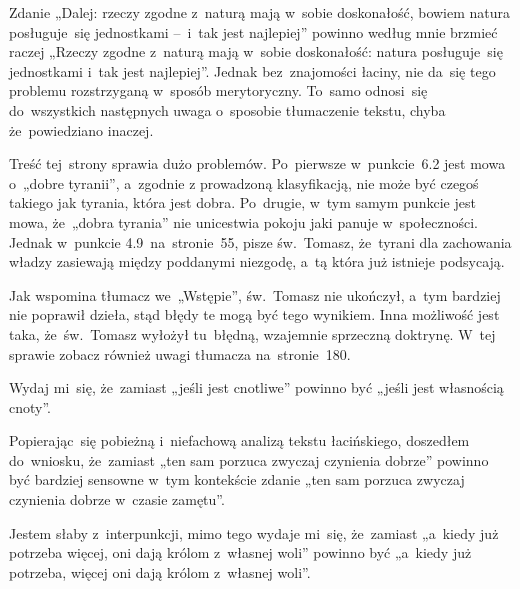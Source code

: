 \documentclass[a4paper,11pt]{article}
\begin{document}
\vspace{\spaceFour}


\start {} Zdanie „Dalej: rzeczy zgodne z~naturą mają
w~sobie doskonałość, bowiem natura posługuje~się jednostkami --~i~tak
jest najlepiej” powinno według mnie brzmieć raczej „Rzeczy zgodne
z~naturą mają w~sobie doskonałość: natura posługuje~się jednostkami
i~tak jest najlepiej”. Jednak bez~znajomości łaciny, nie da~się tego
problemu rozstrzyganą w~sposób merytoryczny. To~samo odnosi~się
do~wszystkich następnych uwaga o~sposobie tłumaczenie tekstu, chyba
że~powiedziano inaczej.

\vspace{\spaceFour}


\start {} Treść tej~strony sprawia dużo problemów. Po~pierwsze
w~punkcie~6.2 jest mowa o~„dobre tyranii”, a~zgodnie z prowadzoną
klasyfikacją, nie może być czegoś takiego jak tyrania, która jest
dobra. Po~drugie, w~tym samym punkcie jest mowa, że~„dobra tyrania”
nie unicestwia pokoju jaki panuje w~społeczności. Jednak w~punkcie
4.9~na~stronie~55, pisze św.~Tomasz, że~tyrani dla zachowania władzy
zasiewają między poddanymi niezgodę, a~tą która już istnieje
podsycają.

Jak wspomina tłumacz we~„Wstępie”, św.~Tomasz nie ukończył, a~tym
bardziej nie poprawił dzieła, stąd błędy te mogą być tego wynikiem.
Inna możliwość jest taka, że~św.~Tomasz wyłożył tu~błędną, wzajemnie
sprzeczną doktrynę. W~tej sprawie zobacz również uwagi tłumacza
na~stronie~180.

\vspace{\spaceFour}


\start {} Wydaj mi~się, że~zamiast „jeśli jest cnotliwe”
powinno być „jeśli jest własnością cnoty”.

\vspace{\spaceFour}


\start {} Popierając~się pobieżną i~niefachową analizą
tekstu łacińskiego, doszedłem do~wniosku, że~zamiast „ten sam porzuca
zwyczaj czynienia dobrze” powinno być bardziej sensowne w~tym
kontekście zdanie „ten sam porzuca zwyczaj czynienia dobrze w~czasie
zamętu”.

\vspace{\spaceFour}


\start {} Jestem słaby z~interpunkcji, mimo tego wydaje
mi~się, że~zamiast „a~kiedy już potrzeba więcej, oni dają królom
z~własnej woli” powinno być „a~kiedy już potrzeba, więcej oni dają
królom z~własnej woli”.
\end{document}
